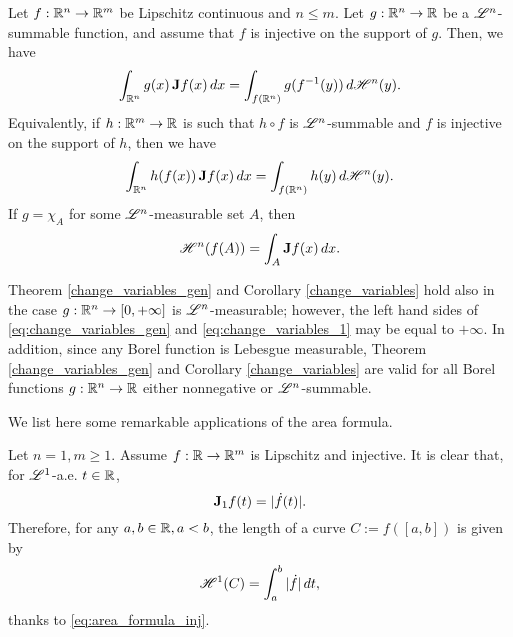 \begin{corollary} \label{change_variables}
Let $f : \mathbb{R}^{n} \to \mathbb{R}^{m}$ be Lipschitz continuous and $n \le m$. Let $g : \mathbb{R}^{n} \to \mathbb{R}$ be a $\mathscr{L}^{n}$-summable function, and assume that $f$ is injective on the support of $g$. Then, we have
\begin{equation} \label{eq:change_variables_1}
\int_{\mathbb{R}^{n}} g(x) \, {\bf J} f(x) \, dx = \int_{f(\mathbb{R}^{n})} g(f^{-1}(y)) \, d \mathscr{H}^{n}(y).
\end{equation}
Equivalently, if $h : \mathbb{R}^{m} \to \mathbb{R}$ is such that $h \circ f$ is $\mathscr{L}^{n}$-summable and $f$ is injective on the support of $h$, then we have
\begin{equation} \label{eq:change_variables_2}
\int_{\mathbb{R}^{n}} h(f(x)) \, {\bf J} f(x) \, dx = \int_{f(\mathbb{R}^{n})} h(y) \, d \mathscr{H}^{n}(y).
\end{equation}
If $g = \chi_{A}$ for some $\mathscr{L}^{n}$-measurable set $A$, then
\begin{equation} \label{eq:area_formula_inj}
\mathscr{H}^{n}(f(A)) = \int_{A} {\bf J} f(x) \, dx.
\end{equation}
\end{corollary}

\begin{remark}
Theorem \ref{change_variables_gen} and Corollary \ref{change_variables} hold also in the case $g : \mathbb{R}^{n} \to [0, + \infty]$ is $\mathscr{L}^{n}$-measurable; however, the left hand sides of \eqref{eq:change_variables_gen} and \eqref{eq:change_variables_1} may be equal to $+ \infty$.
In addition, since any Borel function is Lebesgue measurable, Theorem \ref{change_variables_gen} and Corollary \ref{change_variables} are valid for all Borel functions $g : \mathbb{R}^{n} \to \mathbb{R}$ either nonnegative or $\mathscr{L}^{n}$-summable.
\end{remark}

We list here some remarkable applications of the area formula.

\begin{example}
Let $n = 1, m \ge 1$. Assume $f : \mathbb{R} \to \mathbb{R}^{m}$ is Lipschitz and injective. It is clear that, for $\mathscr{L}^{1}$-a.e. $t \in \mathbb{R}$,
\begin{equation*}
{\bf J}_{1} f(t) = |\dot{f}(t)|. 
\end{equation*}
Therefore, for any $a, b \in \mathbb{R}, a < b$, the length of a curve $C := f([a, b])$ is given by
\begin{equation*}
\mathscr{H}^{1}(C) = \int_{a}^{b} |\dot{f}| \, dt,
\end{equation*}
thanks to \eqref{eq:area_formula_inj}.
\end{example}

